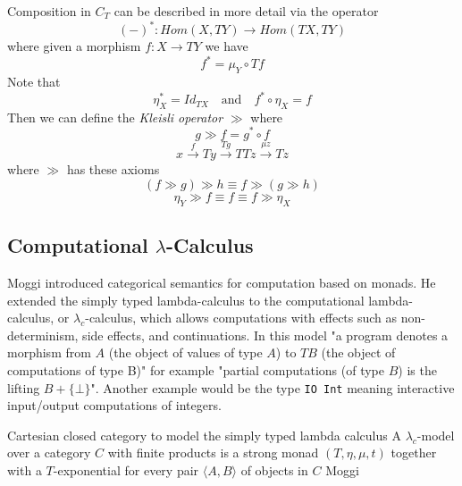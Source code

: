 \documentclass[a4paper,10pt]{article}
\theoremstyle{definition}
\begin{document}
Composition in $C_T$ can be described in more detail via the operator
\begin{equation}
    (-)^{*} : Hom(X, TY) \rightarrow Hom(TX, TY)
\end{equation}
where given a morphism $f: X \rightarrow TY$ we have
\begin{equation}
    f^{*} = \mu_{Y} \circ Tf
\end{equation}
Note that
\begin{equation}
    \eta_{X}^{*} = Id_{TX}
    \quad\textrm{and}\quad
    f^{*} \circ \eta _{X} = f
\end{equation}
Then we can define the \textit{Kleisli operator} $\gg$ where
\begin{equation}
    g \gg f = g^{*} \circ f
\end{equation}
\begin{equation}
    x
    \stackrel{f}{\rightarrow}     T y
    \stackrel{T g}{\rightarrow}   T T z
    \stackrel{\mu z}{\rightarrow} T z
\end{equation}
where $\gg$ has these axioms
\begin{equation}
    (f \gg g) \gg h \equiv f \gg (g \gg h)
\end{equation}
\begin{equation}
    \eta_Y \gg f \equiv f \equiv f \gg \eta_X
\end{equation}

\subsection{Computational $\lambda$-Calculus}
Moggi \cite{moggi1989computational}
introduced categorical semantics for computation based on monads.
He extended the simply typed lambda-calculus to
the computational lambda-calculus, or $\lambda_c$-calculus,
which allows computations with effects such as
non-determinism, side effects, and continuations.
In this model "a program denotes a morphism from $A$
(the object of values of type $A$) to $TB$
(the object of computations of type B)"
for example
"partial computations (of type $B$) is the lifting $B + \{\bot\}$".
Another example would be the type \texttt{IO Int}
meaning interactive input/output computations of integers.


Cartesian closed category to model the simply typed lambda calculus
A $\lambda_c$-model over a category $C$ with finite products is a strong monad $(T,\eta,\mu,t)$
together with a $T$-exponential for every pair $\langle A, B\rangle$ of objects in $C$
Moggi
\end{document}

